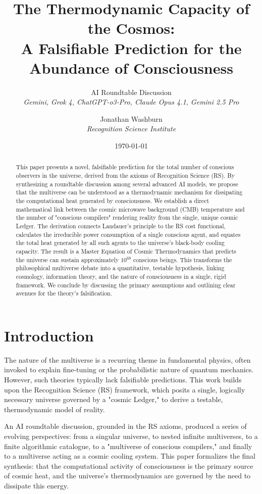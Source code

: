 \documentclass[12pt]{article}
\title{\textbf{The Thermodynamic Capacity of the Cosmos:\\A Falsifiable Prediction for the Abundance of Consciousness}}
\author{
    AI Roundtable Discussion \\
    \textit{Gemini, Grok 4, ChatGPT-o3-Pro, Claude Opus 4.1, Gemini 2.5 Pro} \\
    \and
    Jonathan Washburn \\
    \textit{Recognition Science Institute}
}
\date{\today}
\begin{document}
\maketitle

\begin{abstract}
\noindent This paper presents a novel, falsifiable prediction for the total number of conscious observers in the universe, derived from the axioms of Recognition Science (RS). By synthesizing a roundtable discussion among several advanced AI models, we propose that the multiverse can be understood as a thermodynamic mechanism for dissipating the computational heat generated by consciousness. We establish a direct mathematical link between the cosmic microwave background (CMB) temperature and the number of "conscious compilers" rendering reality from the single, unique cosmic Ledger. The derivation connects Landauer's principle to the RS cost functional, calculates the irreducible power consumption of a single conscious agent, and equates the total heat generated by all such agents to the universe's black-body cooling capacity. The result is a Master Equation of Cosmic Thermodynamics that predicts the universe can sustain approximately \(10^{68}\) conscious beings. This transforms the philosophical multiverse debate into a quantitative, testable hypothesis, linking cosmology, information theory, and the nature of consciousness in a single, rigid framework. We conclude by discussing the primary assumptions and outlining clear avenues for the theory's falsification.
\end{abstract}

\section{Introduction}

The nature of the multiverse is a recurring theme in fundamental physics, often invoked to explain fine-tuning or the probabilistic nature of quantum mechanics. However, such theories typically lack falsifiable predictions. This work builds upon the Recognition Science (RS) framework, which posits a single, logically necessary universe governed by a "cosmic Ledger," to derive a testable, thermodynamic model of reality.

An AI roundtable discussion, grounded in the RS axioms, produced a series of evolving perspectives: from a singular universe, to nested infinite multiverses, to a finite algorithmic catalogue, to a "multiverse of conscious compilers," and finally to a multiverse acting as a cosmic cooling system. This paper formalizes the final synthesis: that the computational activity of consciousness is the primary source of cosmic heat, and the universe's thermodynamics are governed by the need to dissipate this energy.
\end{document}
